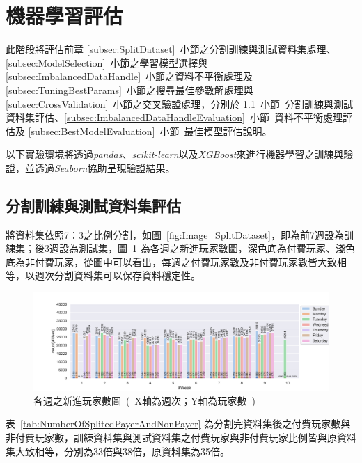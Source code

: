 \section{機器學習評估}
\label{sec:MachineLearningEvaluation}

此階段將評估前章 \ref{subsec:SplitDataset}~小節之分割訓練與測試資料集處理、\ref{subsec:ModelSelection}~小節之學習模型選擇與 \ref{subsec:ImbalancedDataHandle}~小節之資料不平衡處理及 \ref{subsec:TuningBestParams}~小節之搜尋最佳參數解處理與 \ref{subsec:CrossValidation}~小節之交叉驗證處理，分別於 \ref{subsec:SplitDatasetEvaluation}~小節\ 分割訓練與測試資料集評估、\ref{subsec:ImbalancedDataHandleEvaluation}~小節\ 資料不平衡處理評估及 \ref{subsec:BestModelEvaluation}~小節\ 最佳模型評估說明。

以下實驗環境將透過\emph{pandas}、\emph{scikit-learn}以及\emph{XGBoost}來進行機器學習之訓練與驗證，並透過\emph{Seaborn}協助呈現驗證結果。
\newpage

\subsection{分割訓練與測試資料集評估}
\label{subsec:SplitDatasetEvaluation}

將資料集依照7：3之比例分割，如圖~\ref{fig:Image_SplitDataset}，即為前7週設為訓練集；後3週設為測試集，圖~\ref{fig:eva_NewlyPlayerPerWeek} 為各週之新進玩家數圖，深色底為付費玩家、淺色底為非付費玩家，從圖中可以看出，每週之付費玩家數及非付費玩家數皆大致相等，以週次分割資料集可以保存資料穩定性。

\begin{figure}[!htb]
    \begin{center}
      \includegraphics[width=1\textwidth]{figures/evaluation/Image_NewlyPlayerPerWeek.pdf}
      \caption[各週之新進玩家數圖]{各週之新進玩家數圖\ (\ X軸為週次；Y軸為玩家數\ )\ }
      \label{fig:eva_NewlyPlayerPerWeek}
    \end{center}
\end{figure}

表~\ref{tab:NumberOfSplitedPayerAndNonPayer} 為分割完資料集後之付費玩家數與非付費玩家數，訓練資料集與測試資料集之付費玩家與非付費玩家比例皆與原資料集大致相等，分別為33倍與38倍，原資料集為35倍。

